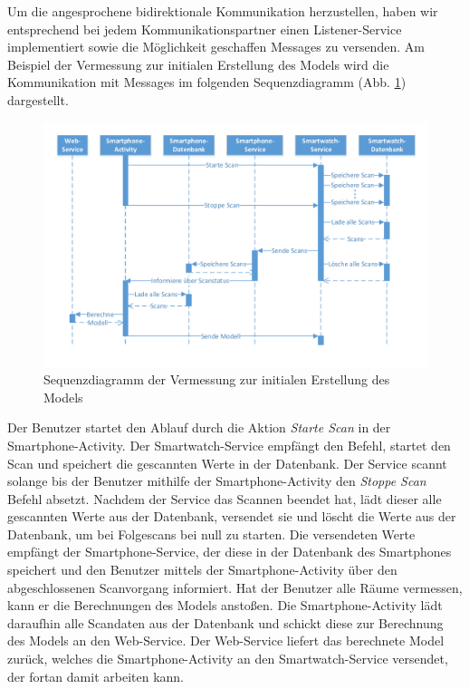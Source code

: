 Um die angesprochene bidirektionale Kommunikation herzustellen, haben wir entsprechend
bei jedem Kommunikationspartner einen Listener-Service implementiert sowie die Möglichkeit geschaffen Messages zu versenden. Am Beispiel der Vermessung zur initialen Erstellung des Models wird die Kommunikation mit Messages im folgenden Sequenzdiagramm (Abb. \ref{fig:SequenzdiagrammScan}) dargestellt.

\begin{figure}[H]
\centering
\includegraphics[width=1\linewidth]{../Bilder/SequenzdiagrammScan}
\caption{Sequenzdiagramm der Vermessung zur initialen Erstellung des Models}
\label{fig:SequenzdiagrammScan}
\end{figure}

Der Benutzer startet den Ablauf durch die Aktion \textit{Starte Scan} in der Smartphone-Activity. Der Smartwatch-Service empfängt den Befehl, startet den Scan und speichert die gescannten Werte in der Datenbank. Der Service scannt solange bis der Benutzer mithilfe der Smartphone-Activity den \textit{Stoppe Scan} Befehl absetzt. Nachdem der Service das Scannen beendet hat, lädt dieser alle gescannten Werte aus der Datenbank, versendet sie und löscht die Werte aus der Datenbank, um bei Folgescans bei null zu starten. Die versendeten Werte empfängt der Smartphone-Service, der diese in der Datenbank des Smartphones speichert und den Benutzer mittels der Smartphone-Activity über den abgeschlossenen Scanvorgang informiert. Hat der Benutzer alle Räume vermessen, kann er die Berechnungen des Models anstoßen. Die Smartphone-Activity lädt daraufhin alle Scandaten aus der Datenbank und schickt diese zur Berechnung des Models an den Web-Service. Der Web-Service liefert das berechnete Model zurück, welches die Smartphone-Activity an den Smartwatch-Service versendet, der fortan damit arbeiten kann.

